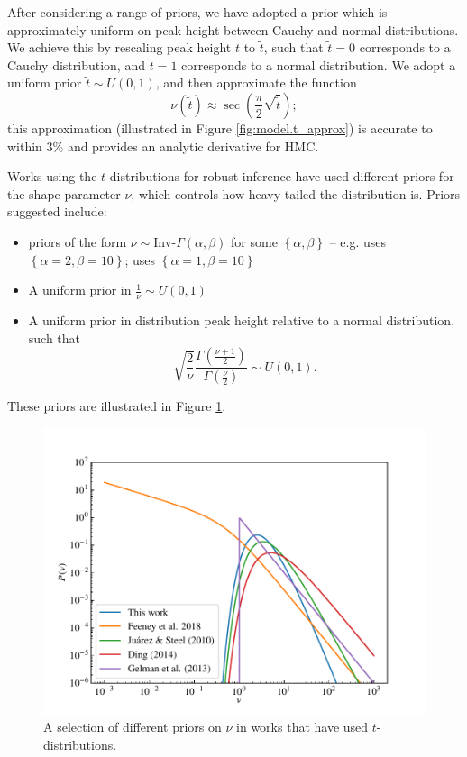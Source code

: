 \documentclass[fleqn,usenatbib]{mnras}
\begin{document}
After considering a range of priors, we have adopted a prior which is
approximately uniform on peak height between Cauchy and normal distributions.
We achieve this by rescaling peak height $t$ to $\tilde{t}$, such that
$\tilde{t} = 0$ corresponds to a Cauchy distribution, and $\tilde{t} = 1$
corresponds to a normal distribution. We adopt a uniform prior $\tilde{t} \sim
U\left(0, 1\right)$, and then approximate the function
\begin{equation}
    \nu\left(\tilde{t}\right)
        \approx
    \sec \left(\frac{\pi}{2} \sqrt{\tilde{t}} \right);
    \label{eqn:model.t_approx}
\end{equation}
this approximation (illustrated in Figure \ref{fig:model.t_approx}) is accurate
to within 3\% and provides an analytic derivative for HMC.

Works using the $t$-distributions for robust inference have used different
priors for the shape parameter $\nu$, which controls how heavy-tailed the
distribution is. Priors suggested include:
\begin{itemize}
    \item priors of the form $\nu \sim \text{Inv-}\Gamma(\alpha, \beta)$ for
          some $\left\{\alpha, \beta\right\}$ -- e.g.
          \citet{Juarez:2010} uses $\left\{\alpha = 2, \beta = 10\right\}$;
          \citet{Ding:2014} uses $\left\{\alpha = 1, \beta = 10\right\}$
    \item A uniform prior in $\frac1\nu \sim U(0, 1)$ \citep{Gelman:2013}
    \item A uniform prior in distribution peak height relative to a normal
    distribution, such that
    \begin{equation}
        \sqrt{\frac2\nu}\frac{\Gamma\left(\frac{\nu + 1}{2}\right)}{\Gamma\left(\frac{\nu}{2}\right)} \sim U(0, 1).
    \end{equation}
\end{itemize}
These priors are illustrated in Figure \ref{fig:priors.pdf}.

\begin{figure}
	\includegraphics[width=\columnwidth]{graphics/pdf_nu}
    \caption{A selection of different priors on $\nu$ in works that have used
    $t$-distributions.}
    \label{fig:priors.pdf}
\end{figure}
\end{document}
